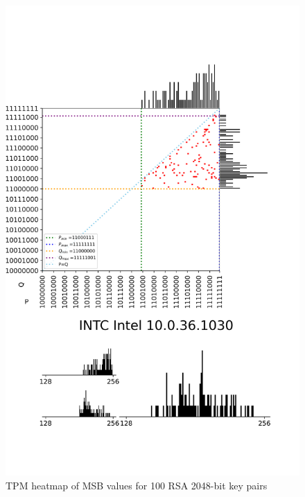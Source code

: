 \begin{figure}[H]
    \centering
    \includegraphics[width=\textwidth,height=\textheight-1.5cm, keepaspectratio]{img/visualizations/rsa1.png}
    \caption{TPM heatmap of MSB values for 100 RSA 2048-bit key pairs}
    \label{fig:heatmap-rsa-100-2048}
\end{figure}

